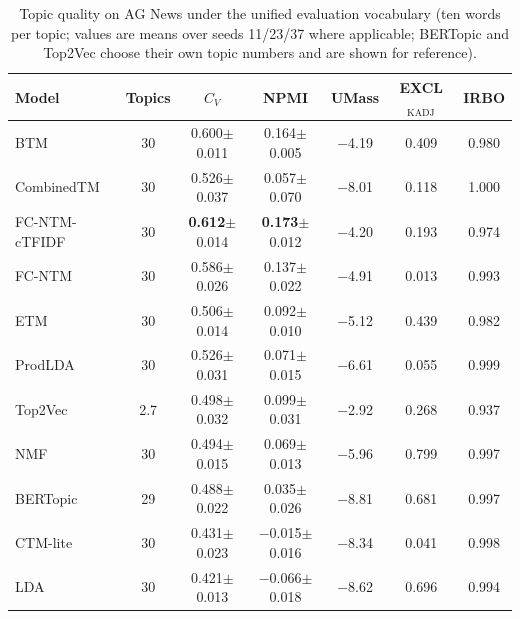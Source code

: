 \documentclass[pdflatex,sn-basic]{sn-jnl}
\newcommand{\fcntm}{FC-NTM}
\begin{document}
\begin{table}[t]
\centering
\caption{Topic quality on AG News under the unified evaluation vocabulary (ten words per topic; values are means over seeds 11/23/37 where applicable; BERTopic and Top2Vec choose their own topic numbers and are shown for reference).}
\label{tab:agnews}
\small
\begin{tabular}{lcccccc}
\toprule
Model & Topics & $C_V$ & NPMI & UMass & EXCL$_{\mathrm{KADJ}}$ & IRBO \\
\midrule
BTM & 30 & 0.600$\pm$0.011 & 0.164$\pm$0.005 & $-$4.19 & 0.409 & 0.980 \\
CombinedTM & 30 & 0.526$\pm$0.037 & 0.057$\pm$0.070 & $-$8.01 & 0.118 & 1.000 \\
\fcntm{}-cTFIDF & 30 & \textbf{0.612}$\pm$0.014 & \textbf{0.173}$\pm$0.012 & $-$4.20 & 0.193 & 0.974 \\
\fcntm{} & 30 & 0.586$\pm$0.026 & 0.137$\pm$0.022 & $-$4.91 & 0.013 & 0.993 \\
ETM & 30 & 0.506$\pm$0.014 & 0.092$\pm$0.010 & $-$5.12 & 0.439 & 0.982 \\
ProdLDA & 30 & 0.526$\pm$0.031 & 0.071$\pm$0.015 & $-$6.61 & 0.055 & 0.999 \\
Top2Vec & 2.7 & 0.498$\pm$0.032 & 0.099$\pm$0.031 & $-$2.92 & 0.268 & 0.937 \\
NMF & 30 & 0.494$\pm$0.015 & 0.069$\pm$0.013 & $-$5.96 & 0.799 & 0.997 \\
BERTopic & 29 & 0.488$\pm$0.022 & 0.035$\pm$0.026 & $-$8.81 & 0.681 & 0.997 \\
CTM-lite & 30 & 0.431$\pm$0.023 & $-$0.015$\pm$0.016 & $-$8.34 & 0.041 & 0.998 \\
LDA & 30 & 0.421$\pm$0.013 & $-$0.066$\pm$0.018 & $-$8.62 & 0.696 & 0.994 \\
\bottomrule
\end{tabular}
\end{table}
\end{document}
